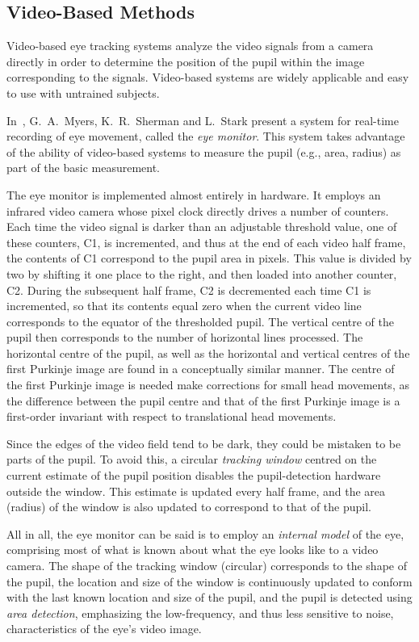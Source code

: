 \subsection{Video-Based Methods}
\label{back:track:monitor}

Video-based eye tracking systems analyze the video signals from a
camera directly in order to determine the position of the pupil within
the image corresponding to the signals.  Video-based systems are
widely applicable and easy to use with untrained subjects.

In~\cite{monitor}, G.\ A.\ Myers, K.\ R.\ Sherman and L.\ Stark
present a system for real-time recording of eye movement, called the
{\em eye monitor\/}.  This system takes advantage of the ability of
video-based systems to measure the pupil (e.g., area, radius) as part
of the basic measurement.

The eye monitor is implemented almost entirely in hardware.  It
employs an infrared video camera whose pixel clock directly drives a
number of counters.  Each time the video signal is darker than an
adjustable threshold value, one of these counters, C1, is incremented,
and thus at the end of each video half frame, the contents of C1
correspond to the pupil area in pixels.  This value is divided by two
by shifting it one place to the right, and then loaded into another
counter, C2.  During the subsequent half frame, C2 is decremented each
time C1 is incremented, so that its contents equal zero when the
current video line corresponds to the equator of the thresholded
pupil.  The vertical centre of the pupil then corresponds to the
number of horizontal lines processed.  The horizontal centre of the
pupil, as well as the horizontal and vertical centres of the first
Purkinje image are found in a conceptually similar manner.  The centre
of the first Purkinje image is needed make corrections for small head
movements, as the difference between the pupil centre and that of the
first Purkinje image is a first-order invariant with respect to
translational head movements.

Since the edges of the video field tend to be dark, they could be
mistaken to be parts of the pupil.  To avoid this, a circular {\em
  tracking window\/} centred on the current estimate of the pupil
position disables the pupil-detection hardware outside the window.
This estimate is updated every half frame, and the area (radius) of
the window is also updated to correspond to that of the pupil.

All in all, the eye monitor can be said is to employ an {\em internal
  model\/} of the eye, comprising most of what is known about what the
eye looks like to a video camera.  The shape of the tracking window
(circular) corresponds to the shape of the pupil, the location and
size of the window is continuously updated to conform with the last
known location and size of the pupil, and the pupil is detected using
{\em area detection\/}, emphasizing the low-frequency, and thus less
sensitive to noise, characteristics of the eye's video image.

